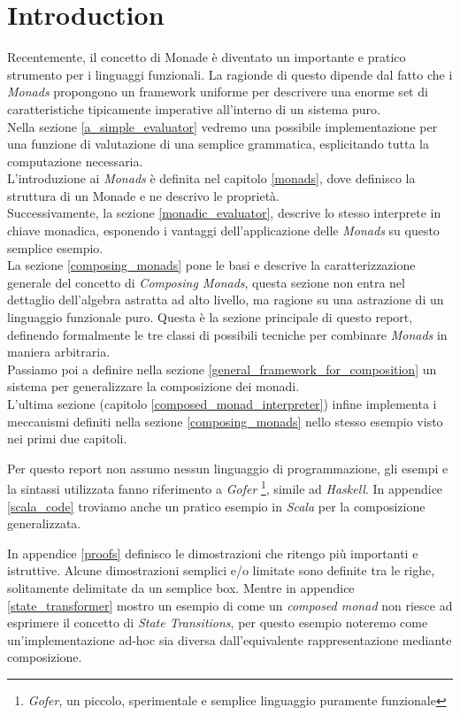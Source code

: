 \section{Introduction}

Recentemente, il concetto di Monade è diventato un importante e pratico
strumento per i linguaggi funzionali.
La ragionde di questo dipende dal fatto che i \textit{Monads} propongono un
framework uniforme per descrivere una enorme set di caratteristiche tipicamente
imperative all'interno di un sistema puro.\\
Nella sezione \ref{a_simple_evaluator} vedremo una possibile implementazione per
una funzione di valutazione di una semplice grammatica, esplicitando tutta la
computazione necessaria.\\
L'introduzione ai \textit{Monads} è definita nel capitolo \ref{monads}, dove
definisco la struttura di un Monade e ne descrivo le proprietà.\\
Successivamente, la sezione \ref{monadic_evaluator}, descrive lo stesso
interprete in chiave monadica, esponendo i vantaggi dell'applicazione delle
\textit{Monads} su questo semplice esempio.\\
La sezione \ref{composing_monads} pone le basi e descrive la caratterizzazione
generale del concetto di \textit{Composing Monads}, questa sezione non entra nel
dettaglio dell'algebra astratta ad alto livello, ma ragione su una astrazione
di un linguaggio funzionale puro. Questa è la sezione principale di questo
report, definendo formalmente le tre classi di possibili tecniche per combinare
\textit{Monads} in maniera arbitraria.\\
Passiamo poi a definire nella sezione \ref{general_framework_for_composition}
un sistema per generalizzare la composizione dei monadi.\\
L'ultima sezione (capitolo \ref{composed_monad_interpreter}) infine implementa
i meccanismi definiti nella sezione \ref{composing_monads} nello stesso esempio
visto nei primi due capitoli.\newline

Per questo report non assumo nessun linguaggio di programmazione, gli esempi e
la sintassi utilizzata fanno riferimento a \textit{Gofer}
\footnote{\textit{Gofer}, un piccolo, sperimentale e semplice linguaggio
puramente funzionale}, simile ad \textit{Haskell}.
In appendice \ref{scala_code} troviamo anche un pratico esempio in \textit{Scala} per la composizione
generalizzata.\newline

In appendice \ref{proofs} definisco le dimostrazioni che ritengo più importanti
e istruttive. Alcune dimostrazioni semplici e/o limitate sono definite tra le
righe, solitamente delimitate da un semplice box.
Mentre in appendice \ref{state_transformer} mostro un esempio di come un
\textit{composed monad} non riesce ad esprimere il concetto di
\textit{State Transitions}, per questo esempio noteremo come un'implementazione
ad-hoc sia diversa dall'equivalente rappresentazione mediante composizione.


\newpage